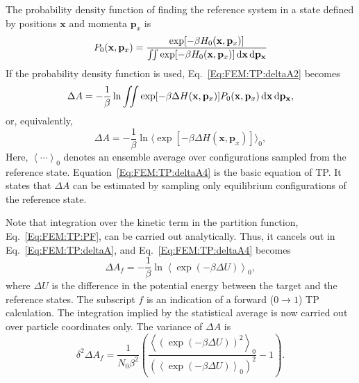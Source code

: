 The probability density function of finding the reference system in a state defined by positions $\mathbf{x}$ and momenta $\mathbf{p}_{x}$ is 
\begin{equation}
  P_{0}(\mathbf{x},\mathbf{p}_{x}) = \frac{ \exp[-\beta H_{0}(\mathbf{x},\mathbf{p}_{x}) ] }{\iint \exp[-\beta H_{0}(\mathbf{x},\mathbf{p}_{x}) ] \mathop{}\!\mathrm{d}\mathbf{x}\mathop{}\!\mathrm{d}\mathbf{p}_\mathbf{x}}
  \label{Eq:FEM:TP:proden}
\end{equation}
If the probability density function is used, Eq.~\ref{Eq:FEM:TP:deltaA2} becomes
\begin{equation}
  \Delta A = -\frac{1}{\beta} \ln \iint \exp[-\beta \Delta H(\mathbf{x},\mathbf{p}_{x})] P_{0}(\mathbf{x},\mathbf{p}_{x}) \mathop{}\!\mathrm{d}\mathbf{x}\mathop{}\!\mathrm{d}\mathbf{p}_\mathbf{x},
  \label{Eq:FEM:TP:deltaA3}
\end{equation}
or, equivalently,
\begin{equation}
  \Delta A = -\frac{1}{\beta} \ln{\langle \exp{\left[-\beta \Delta H(\mathbf{x},\mathbf{p}_{x})\right]} \rangle_{0}},
  \label{Eq:FEM:TP:deltaA4}
\end{equation}
Here, $\left \langle \cdots \right \rangle _{0}$ denotes an ensemble average over configurations sampled from the reference state. Equation~\ref{Eq:FEM:TP:deltaA4} is the basic equation of TP. It states that $\Delta A$ can be estimated by sampling only equilibrium configurations of the reference state.

Note that integration over the kinetic term in the partition function, Eq.~\ref{Eq:FEM:TP:PF}, can be carried out analytically. Thus, it cancels out in Eq.~\ref{Eq:FEM:TP:deltaA}, and Eq.~\ref{Eq:FEM:TP:deltaA4} becomes
\begin{equation}
  \Delta A_f = -\frac{1}{\beta} \ln{\left< \exp(-\beta \Delta U) \right>_{0}},
  \label{Eq:FEM:TP:deltaA5}
\end{equation}
where $\Delta U$ is the difference in the potential energy between the target and the reference states. The subscript $f$ is an indication of a forward ($0\rightarrow 1$) TP calculation. The integration implied by the statistical average is now carried out over particle coordinates only. The variance of $\Delta A$ is
\begin{equation}
    \delta^2 \Delta A_f=\frac{1}{N_0\beta^2}\left(\frac{\left<(\exp(-\beta \Delta U))^2\right>_0}{\left(\left<\exp(-\beta \Delta U)\right>_0\right)^2}-1\right).
\end{equation}

